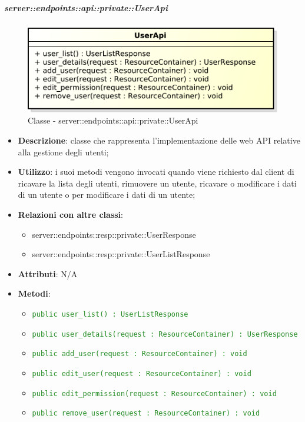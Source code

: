     \subparagraph{server::endpoints::api::private::UserApi} %
    \label{subp:bdsm_app_server_endpoints_api_private_userapi}
	\begin{figure}[!htbp]
		\centering
		\centerline{\includegraphics[scale=0.6]{./images/server/classes/endpoints/user_api.pdf}}
		\caption{Classe - server::endpoints::api::private::UserApi}
	\end{figure}
    \begin{itemize}
      \item \textbf{Descrizione}: classe che rappresenta l'implementazione delle web API relative alla gestione degli utenti;
      \item \textbf{Utilizzo}: i suoi metodi vengono invocati quando viene richiesto dal client di ricavare la lista degli utenti, rimuovere un utente, ricavare o modificare i dati di un utente o per modificare i dati di un utente;
      \item \textbf{Relazioni con altre classi}:
        \begin{itemize}
          \item server::endpoints::resp::private::UserResponse
          \item server::endpoints::resp::private::UserListResponse
        \end{itemize}
		\item \textbf{Attributi}: N/A
		\item \textbf{Metodi}:
			\begin{itemize}
				\item \textcolor{forestgreen}{\texttt{public user\_list() : UserListResponse}}
				\item \textcolor{forestgreen}{\texttt{public user\_details(request : ResourceContainer) : UserResponse}}
				\item \textcolor{forestgreen}{\texttt{public add\_user(request : ResourceContainer) : void}}
				\item \textcolor{forestgreen}{\texttt{public edit\_user(request : ResourceContainer) : void}}
				\item \textcolor{forestgreen}{\texttt{public edit\_permission(request : ResourceContainer) : void}}
				\item \textcolor{forestgreen}{\texttt{public remove\_user(request : ResourceContainer) : void}}
     	 \end{itemize}
      \end{itemize}

